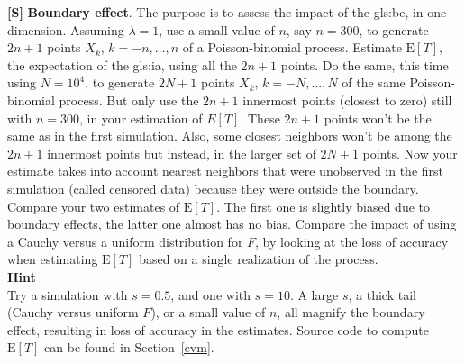 \documentclass[10pt]{article}
\begin{document}
\begin{Exercise}\label{exercise9}
{\bf [S]}  {\bf Boundary effect}. The purpose is to assess the impact of the \gls{gls:be}, in one dimension. Assuming $\lambda=1$, use a small value of $n$, say $n=300$, to generate $2n+1$ points $X_k$, $k=-n,\dots,n$ of a Poisson-binomial process. Estimate $\mbox{E}[T]$, the expectation of the 
\gls{gls:ia}, using all the $2n+1$ points.  
Do the same, this time using $N=10^4$,  to generate $2N+1$ points $X_k$, $k=-N,\dots,N$ of the same Poisson-binomial process.
But only use the $2n+1$ innermost points (closest to zero) still with $n=300$,  in your 
estimation of $E[T]$. These $2n+1$ points won't be the same as in the first simulation. Also, some closest neighbors won't be among the $2n+1$ innermost points but instead, in the larger set of $2N+1$ points. Now your estimate takes into account nearest neighbors that were unobserved in the first simulation (called
 \textcolor{index}{censored data}) because they were outside the boundary. Compare your two estimates of $\mbox{E}[T]$. The first one is slightly biased due to boundary effects, the latter one almost has no bias. 
Compare the impact of using a Cauchy versus a uniform distribution for $F$, by looking at the loss of accuracy when estimating $\mbox{E}[T]$ based on a single realization of the process.  \vspace{1ex}\\
{\bf Hint} \vspace{1ex}\\
Try a simulation with $s=0.5$, and one with $s=10$. A large $s$, a thick tail (Cauchy versus uniform $F$), or a small value of $n$, all magnify the boundary effect, resulting in loss of accuracy in the estimates. Source code to compute $\mbox{E}[T]$ can be found in Section~\ref{evm}.
\end{Exercise} 
\end{document}
